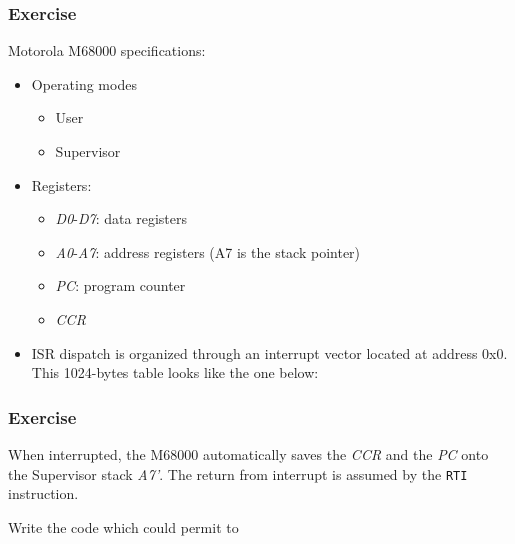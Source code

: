 %
%
%

\begin{frame}
  \frametitle{Exercise}

  Motorola M68000 specifications:

  \begin{itemize}
    \item Operating modes
      \begin{itemize}
        \item User
	\item Supervisor
      \end{itemize}

    \item Registers:
      \begin{itemize}
        \item {\em D0}-{\em D7}: data registers
        \item {\em A0}-{\em A7}: address registers (A7 is the stack pointer)
        \item {\em PC}: program counter
        \item {\em CCR}
      \end{itemize}

    \item ISR dispatch is organized through an interrupt vector located at
      address 0x0. This 1024-bytes table looks like the one below:

      \nl
      \begin{center}
      \end{center}
  \end{itemize}

\end{frame}

%
%
%

\begin{frame}
  \frametitle{Exercise}

  \nl

  When interrupted, the M68000 automatically saves the {\em CCR} and the
  {\em PC} onto the Supervisor stack {\em A7'}. The return from interrupt is
  assumed by the {\tt RTI} instruction.

  \nl

  Write the code which could permit to 

\end{frame}

%
%
%

